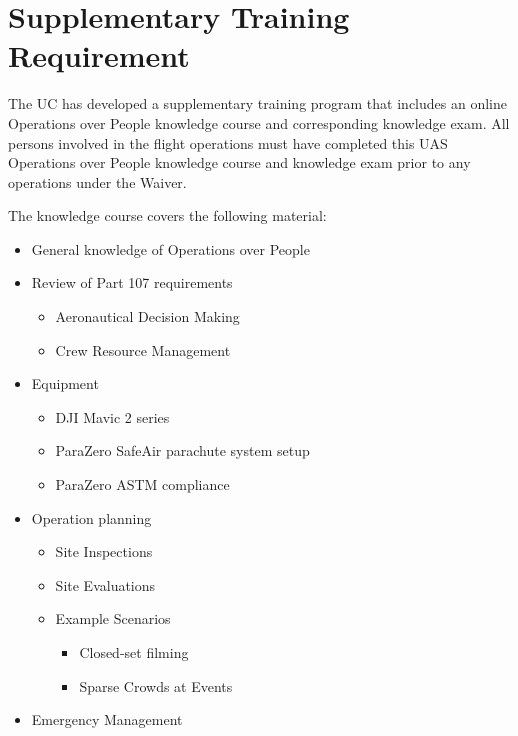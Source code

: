 \documentclass[
]{book}
\providecommand{\tightlist}{%
  \setlength{\itemsep}{0pt}\setlength{\parskip}{0pt}}
\begin{document}
\hypertarget{s39p-tr}{%
\section{Supplementary Training Requirement}\label{s39p-tr}}

The UC has developed a supplementary training program that includes an online Operations over People knowledge course and corresponding knowledge exam. All persons involved in the flight operations must have completed this UAS Operations over People knowledge course and knowledge exam prior to any operations under the Waiver.

The knowledge course covers the following material:

\begin{itemize}
\item
  General knowledge of Operations over People
\item
  Review of Part 107 requirements

  \begin{itemize}
  \tightlist
  \item
    Aeronautical Decision Making
  \item
    Crew Resource Management
  \end{itemize}
\item
  Equipment

  \begin{itemize}
  \tightlist
  \item
    DJI Mavic 2 series
  \item
    ParaZero SafeAir parachute system setup
  \item
    ParaZero ASTM compliance
  \end{itemize}
\item
  Operation planning

  \begin{itemize}
  \item
    Site Inspections
  \item
    Site Evaluations
  \item
    Example Scenarios

    \begin{itemize}
    \tightlist
    \item
      Closed-set filming
    \item
      Sparse Crowds at Events
    \end{itemize}
  \end{itemize}
\item
  Emergency Management


\end{itemize}
\end{document}
